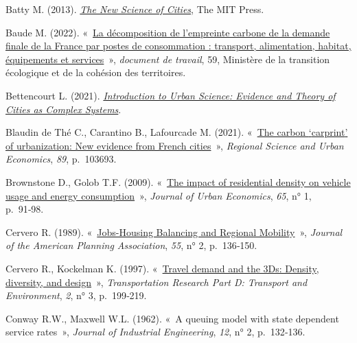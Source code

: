 \documentclass[
  9pt,
  a4paper,
  DIV=11]{scrreprt}
\newlength{\cslhangindent}
\newenvironment{CSLReferences}[2] %
 {\begin{list}{}{%
  \setlength{\itemindent}{0pt}
  \setlength{\leftmargin}{0pt}
  \setlength{\parsep}{0pt}
  \ifodd #1
   \setlength{\leftmargin}{\cslhangindent}
   \setlength{\itemindent}{-1\cslhangindent}
  \fi
  \setlength{\itemsep}{#2\baselineskip}}}
 {\end{list}}
\begin{document}
\label{refs}
\begin{CSLReferences}{0}{1}
Batty M. (2013).
\emph{\href{https://doi.org/10.7551/mitpress/9399.001.0001}{The New
Science of Cities}}, The MIT Press.

Baude M. (2022).
{«~\href{https://www.statistiques.developpement-durable.gouv.fr/sites/default/files/2022-07/document_travail_59_decomposition_empreinte_carbone_juillet2022.pdf}{La
décomposition de l'empreinte carbone de la demande finale de la France
par postes de consommation : transport, alimentation, habitat,
équipements et services}~»}, \emph{document de travail}, 59, Ministère
de la transition écologique et de la cohésion des territoires.

Bettencourt L. (2021).
\emph{\href{https://doi.org/10.7551/mitpress/13909.001.0001}{Introduction
to Urban Science: Evidence and Theory of Cities as Complex Systems}}.

Blaudin de Thé C., Carantino B., Lafourcade M. (2021).
{«~\href{https://doi.org/10.1016/j.regsciurbeco.2021.103693}{The carbon
{`}carprint{'} of urbanization: New evidence from French cities}~»},
\emph{Regional Science and Urban Economics}, \emph{89}, p.~103693.

Brownstone D., Golob T.F. (2009).
{«~\href{https://doi.org/10.1016/j.jue.2008.09.002}{The impact of
residential density on vehicle usage and energy consumption}~»},
\emph{Journal of Urban Economics}, \emph{65}, n° 1, p.~91‑98.

Cervero R. (1989).
{«~\href{https://doi.org/10.1080/01944368908976014}{Jobs-Housing
Balancing and Regional Mobility}~»}, \emph{Journal of the American
Planning Association}, \emph{55}, n° 2, p.~136‑150.

Cervero R., Kockelman K. (1997).
{«~\href{https://doi.org/10.1016/S1361-9209(97)00009-6}{Travel demand
and the 3Ds: Density, diversity, and design}~»}, \emph{Transportation
Research Part D: Transport and Environment}, \emph{2}, n° 3, p.~199‑219.

Conway R.W., Maxwell W.L. (1962). {«~A queuing model with state
dependent service rates~»}, \emph{Journal of Industrial Engineering},
\emph{12}, n° 2, p.~132‑136.


\end{CSLReferences}
\end{document}
